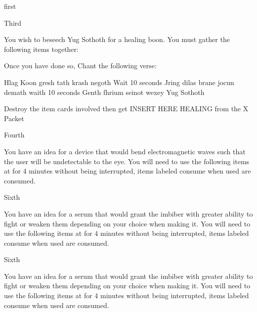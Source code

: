 \documentclass[greennotebook]{guildcamp4} %
\begin{document}
\startnotebook{\nRasputinYog{}}

\begin{page}{first}
\end{page}

\begin{page}{Third}
		
		You wish to beseech Yug Sothoth for a healing boon. You must gather the following items together: 
		
		Once you have done so, Chant the following verse:
		
		Hlag Koon gresh tath krash negoth
		Wait 10 seconds
		Jring dilas brane jocun demath
		waith 10 seconds
		Genth fhrium seinot wexey Yug Sothoth
		
		Destroy the item cards involved then get INSERT HERE HEALING from the X Packet 
	\end{page}
	
\begin{page}{Fourth}
	
	You have an idea for a device that would bend electromagnetic waves such that the user will be undetectable to the eye.
	You will need to use the following items at for 4 minutes without being interrupted, items labeled consume when used are consumed.
	
\end{page}

\begin{page}{Sixth}
	
	You have an idea for a serum that would grant the imbiber with greater ability to fight or weaken them depending on your choice when making it.
	You will need to use the following items at for 4 minutes without being interrupted, items labeled consume when used are consumed.
	
\end{page}

\begin{page}{Sixth}
	
	You have an idea for a serum that would grant the imbiber with greater ability to fight or weaken them depending on your choice when making it.
	You will need to use the following items at for 4 minutes without being interrupted, items labeled consume when used are consumed.
	
\end{page}
\end{document}
